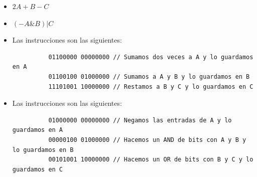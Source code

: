 \documentclass[answers]{exam}
\begin{document}
\begin{questions}
  \begin{itemize}
    \item $2A + B - C$
    \item $(-A \& B) \vert C$
  \end{itemize}
  \begin{solution}
    \begin{itemize}
      \item Las instrucciones son las siguientes:
      \begin{center}
        \begin{verbatim}
          01100000 00000000 // Sumamos dos veces a A y lo guardamos en A
          01100100 01000000 // Sumamos a A y B y lo guardamos en B
          11101001 10000000 // Restamos a B y C y lo guardamos en C
        \end{verbatim}
      \end{center}
      \item Las instrucciones son las siguientes:
      \begin{center}
        \begin{verbatim}
          01000000 00000000 // Negamos las entradas de A y lo guardamos en A
          00000100 01000000 // Hacemos un AND de bits con A y B y lo guardamos en B
          00101001 10000000 // Hacemos un OR de bits con B y C y lo guardamos en C
        \end{verbatim}
      \end{center}
    \end{itemize}
  \end{solution}
\end{questions}
\end{document}
